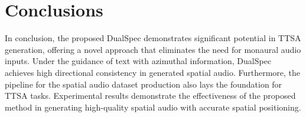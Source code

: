 \documentclass{IEEEtran}
\begin{document}
\section{Conclusions}
\label{sec:con}
In conclusion, the proposed DualSpec demonstrates significant potential in TTSA generation, offering a novel approach that eliminates the need for monaural audio inputs. Under the guidance of text with azimuthal information, DualSpec achieves high directional consistency in generated spatial audio. Furthermore, the pipeline for the spatial audio dataset production also lays the foundation for TTSA tasks. Experimental results demonstrate the effectiveness of the proposed method in generating high-quality spatial audio with accurate spatial positioning.

\small


\end{document}
